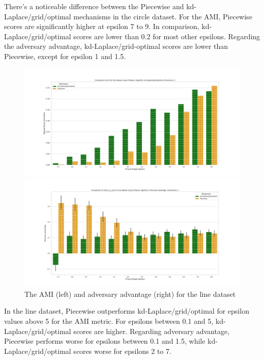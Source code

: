There's a noticeable difference between the Piecewise and kd-Laplace/grid/optimal mechanisms in the circle dataset. For the AMI, Piecewise scores are significantly higher at epsilon 7 to 9. In comparison, kd-Laplace/grid/optimal scores are lower than 0.2 for most other epsilons. Regarding the adversary advantage, kd-Laplace/grid-optimal scores are lower than Piecewise, except for epsilon 1 and 1.5.
\begin{figure}[H]
    \begin{minipage}[c]{0.55\textwidth}
        \includegraphics[width=\textwidth]{Results/RQ3/line-dataset/ami_line-dataset_comparison.png}
    \end{minipage}
    \begin{minipage}[c]{0.55\textwidth}
        \includegraphics[width=\textwidth]{Results/RQ3/line-dataset/shokri_mi_adv_line-dataset_comparison.png}
    \end{minipage}
    \label{fig:advantage_line-dataset_comparison}
    \caption{The AMI (left) and adversary advantage (right) for the line dataset}
\end{figure}
In the line dataset, Piecewise outperforms kd-Laplace/grid/optimal for epsilon values above 5 for the AMI metric. For epsilons between 0.1 and 5, kd-Laplace/grid/optimal scores are higher. Regarding adversary advantage, Piecewise performs worse for epsilons between 0.1 and 1.5, while kd-Laplace/grid/optimal scores worse for epsilons 2 to 7.
